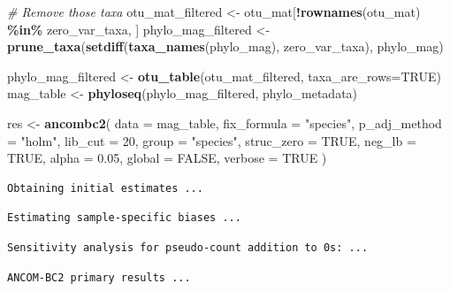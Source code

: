 \documentclass[
]{book}
\newenvironment{Shaded}{\begin{snugshade}}{\end{snugshade}}
\newcommand{\AttributeTok}[1]{\textcolor[rgb]{0.13,0.29,0.53}{#1}}
\newcommand{\CommentTok}[1]{\textcolor[rgb]{0.56,0.35,0.01}{\textit{#1}}}
\newcommand{\ConstantTok}[1]{\textcolor[rgb]{0.56,0.35,0.01}{#1}}
\newcommand{\DecValTok}[1]{\textcolor[rgb]{0.00,0.00,0.81}{#1}}
\newcommand{\FloatTok}[1]{\textcolor[rgb]{0.00,0.00,0.81}{#1}}
\newcommand{\FunctionTok}[1]{\textcolor[rgb]{0.13,0.29,0.53}{\textbf{#1}}}
\newcommand{\NormalTok}[1]{#1}
\newcommand{\OtherTok}[1]{\textcolor[rgb]{0.56,0.35,0.01}{#1}}
\newcommand{\SpecialCharTok}[1]{\textcolor[rgb]{0.81,0.36,0.00}{\textbf{#1}}}
\newcommand{\StringTok}[1]{\textcolor[rgb]{0.31,0.60,0.02}{#1}}
\begin{document}
\begin{Shaded}
\begin{Highlighting}[]
\CommentTok{\# Remove those taxa}
\NormalTok{otu\_mat\_filtered }\OtherTok{\textless{}{-}}\NormalTok{ otu\_mat[}\SpecialCharTok{!}\FunctionTok{rownames}\NormalTok{(otu\_mat) }\SpecialCharTok{\%in\%}\NormalTok{ zero\_var\_taxa, ]}
\NormalTok{phylo\_mag\_filtered }\OtherTok{\textless{}{-}} \FunctionTok{prune\_taxa}\NormalTok{(}\FunctionTok{setdiff}\NormalTok{(}\FunctionTok{taxa\_names}\NormalTok{(phylo\_mag), zero\_var\_taxa), phylo\_mag)}

\NormalTok{phylo\_mag\_filtered }\OtherTok{\textless{}{-}} \FunctionTok{otu\_table}\NormalTok{(otu\_mat\_filtered, }\AttributeTok{taxa\_are\_rows=}\ConstantTok{TRUE}\NormalTok{)}
\NormalTok{mag\_table }\OtherTok{\textless{}{-}} \FunctionTok{phyloseq}\NormalTok{(phylo\_mag\_filtered, phylo\_metadata)}

\NormalTok{res }\OtherTok{\textless{}{-}} \FunctionTok{ancombc2}\NormalTok{(}
  \AttributeTok{data =}\NormalTok{ mag\_table,}
  \AttributeTok{fix\_formula =} \StringTok{"species"}\NormalTok{,}
  \AttributeTok{p\_adj\_method =} \StringTok{"holm"}\NormalTok{,}
  \AttributeTok{lib\_cut =} \DecValTok{20}\NormalTok{,}
  \AttributeTok{group =} \StringTok{"species"}\NormalTok{,}
  \AttributeTok{struc\_zero =} \ConstantTok{TRUE}\NormalTok{,}
  \AttributeTok{neg\_lb =} \ConstantTok{TRUE}\NormalTok{,}
  \AttributeTok{alpha =} \FloatTok{0.05}\NormalTok{,}
  \AttributeTok{global =} \ConstantTok{FALSE}\NormalTok{,}
  \AttributeTok{verbose =} \ConstantTok{TRUE}
\NormalTok{)}
\end{Highlighting}
\end{Shaded}

\begin{verbatim}
Obtaining initial estimates ...
\end{verbatim}

\begin{verbatim}
Estimating sample-specific biases ...
\end{verbatim}

\begin{verbatim}
Sensitivity analysis for pseudo-count addition to 0s: ...
\end{verbatim}

\begin{verbatim}
ANCOM-BC2 primary results ...
\end{verbatim}
\end{document}
